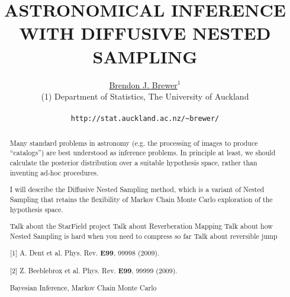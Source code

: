 \documentclass[letterpaper,12pt]{article}
\begin{document}
\title{ASTRONOMICAL INFERENCE WITH DIFFUSIVE NESTED SAMPLING}

\author{\underline{Brendon J. Brewer}$^{1}$\\
        (1) Department of Statistics, The University of Auckland\\
	\\
        {\tt http://stat.auckland.ac.nz/\~{ }brewer/}
       }

\date{}
\maketitle

\begin{abstract}
\noindent

Many standard problems in astronomy (e.g. the processing of images to produce
``catalogs'') are best understood as inference problems. In principle at least,
we should calculate the posterior distribution over a suitable hypothesis space,
rather than inventing ad-hoc procedures.

I will describe the Diffusive Nested Sampling method, which is a variant of
Nested Sampling that retains the flexibility of Markov Chain Monte Carlo
exploration of the hypothesis space.

Talk about the StarField project
Talk about Reverberation Mapping
Talk about how Nested Sampling is hard when you need to compress so far
Talk about reversible jump




\medskip{}

[1] A. Dent et al. Phys. Rev. {\bf E99}, 99998 (2009).

[2] Z. Beeblebrox et al. Phys. Rev. {\bf E99}, 99999 (2009).



\medskip{}
{Bayesian Inference, Markov Chain Monte Carlo}

\end{abstract}
\thispagestyle{empty}
\end{document}
